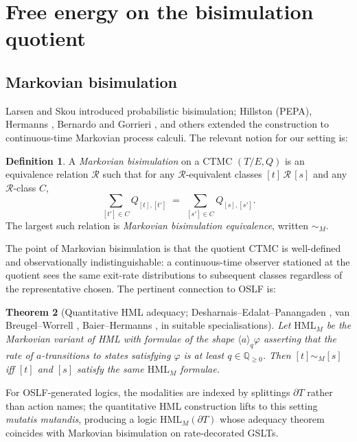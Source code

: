 \documentclass[11pt]{article}
\theoremstyle{plain}
\newtheorem{theorem}{Theorem}[section]
\theoremstyle{definition}
\newtheorem{definition}[theorem]{Definition}
\theoremstyle{remark}
\newcommand{\HML}{\mathrm{HML}}
\newcommand{\bd}{\partial}
\begin{document}
\section{Free energy on the bisimulation quotient}\label{sec:freeenergy}

\subsection{Markovian bisimulation}

Larsen and Skou \cite{LarsenSkou91} introduced probabilistic bisimulation; Hillston \cite{Hillston96} (PEPA), Hermanns \cite{HermannsBaier97}, Bernardo and Gorrieri \cite{BernardoGorrieri98}, and others extended the construction to continuous-time Markovian process calculi. The relevant notion for our setting is:

\begin{definition}\label{def:markovbisim}
A \emph{Markovian bisimulation} on a CTMC $(T/E, Q)$ is an equivalence relation $\mathcal{R}$ such that for any $\mathcal{R}$-equivalent classes $[t]\, \mathcal{R}\, [s]$ and any $\mathcal{R}$-class $C$,
\[
\sum_{[t'] \in C} Q_{[t],[t']} \;=\; \sum_{[s'] \in C} Q_{[s],[s']}.
\]
The largest such relation is \emph{Markovian bisimulation equivalence}, written $\sim_M$.
\end{definition}

The point of Markovian bisimulation is that the quotient CTMC is well-defined and observationally indistinguishable: a continuous-time observer stationed at the quotient sees the same exit-rate distributions to subsequent classes regardless of the representative chosen. The pertinent connection to OSLF is:

\begin{theorem}[Quantitative HML adequacy; Desharnais--Edalat--Panangaden \cite{DEP02}, van Breugel--Worrell \cite{vBW01}, Baier--Hermanns \cite{HermannsBaier97}, in suitable specialisations]\label{thm:qhml}
Let $\HML_M$ be the Markovian variant of HML with formulae of the shape $\langle a \rangle_q \varphi$ asserting that the rate of $a$-transitions to states satisfying $\varphi$ is at least $q \in \mathbb{Q}_{\geq 0}$. Then $[t] \sim_M [s]$ iff $[t]$ and $[s]$ satisfy the same $\HML_M$ formulae.
\end{theorem}

For OSLF-generated logics, the modalities are indexed by splittings $\bd T$ rather than action names; the quantitative HML construction lifts to this setting \emph{mutatis mutandis}, producing a logic $\HML_M(\bd T)$ whose adequacy theorem coincides with Markovian bisimulation on rate-decorated GSLTs.
\end{document}
